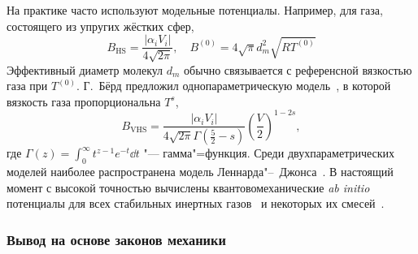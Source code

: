 На практике часто используют модельные потенциалы.
Например, для газа, состоящего из упругих жёстких сфер,
\begin{equation}\label{eq:ci_kernel_hs}
    B_\mathrm{HS} = \frac{|\alpha_i V_i|}{4\sqrt{2\pi}}, \quad
    B^{(0)} = 4\sqrt\pi d_m^2 \sqrt{RT^{(0)}}
\end{equation}
Эффективный диаметр молекул \(d_m\) обычно связывается с референсной вязкостью газа при \(T^{(0)}\).
Г.~Бёрд предложил однопараметрическую модель~\cite{Bird1981vhs}, в которой вязкость газа пропорциональна \(T^s\),
\begin{equation}\label{eq:ci_kernel_vhs}
    B_\mathrm{VHS} = \frac{|\alpha_i V_i|}{4\sqrt{2\pi}\Gamma(\frac52-s)}\left(\frac{V}2\right)^{1-2s},
\end{equation}
где \(\Gamma(z) = \int_0^\infty t^{z-1}e^{-t}\dd{t}\) "--- гамма"=функция.
Среди двухпараметрических моделей наиболее распространена модель Леннарда"--~Джонса~\cite{Jones1924}.
В настоящий момент с высокой точностью вычислены квантовомеханические \textit{ab initio} потенциалы
для всех стабильных инертных газов~\cite{Hellmann2017} и некоторых их смесей~\cite{Jager2017}.

\subsubsection{Вывод на основе законов механики}

